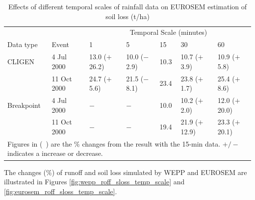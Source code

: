 \begin{table}[htbp]
  \centering
  \footnotesize
  \caption[Effects of different temporal scales of rainfall data on EUROSEM
estimation of soil loss]{Effects of different temporal scales of rainfall data
on EUROSEM estimation of soil loss (t/ha)}
  \label{tab:DifferentTemporalScalesOfRainfallDataOnEUROSEMSoilLoss}
    \begin{tabular}{lllllll}
    \toprule
    & & \multicolumn{5}{c}{Temporal Scale (minutes)}\\
      \cmidrule{3-7}
    Data type & Event & 1 & 5 & 15 & 30 & 60 \\
    \midrule
    CLIGEN & 4 Jul 2000 & 13.0 ($+$26.2) & 10.0 ($-$2.9) & 10.3 & 10.7 ($+$3.9)
& 10.9 ($+$5.8) \\
     & 11 Oct 2000 & 24.7 ($+$5.6) & 21.5 ($-$8.1) & 23.4 & 23.8 ($+$1.7) & 25.4
($+$8.6) \\
     \midrule
    Breakpoint & 4 Jul 2000 & $-$ & $-$ & 10.0 & 10.2 ($+$2.0) & 12.0 ($+$20.0)
\\
     & 11 Oct 2000 & $-$ & $-$ & 19.4 & 21.9 ($+$12.9) & 23.3 ($+$20.1) \\
    \bottomrule
    \multicolumn{7}{p{12cm}}{\footnotesize Figures in (\ ) are the \% changes
from the result with the 15-min data. $+/-$ indicates a increase or decrease.}\\
    \end{tabular}
\end{table}

The changes (\%) of runoff and soil loss simulated by WEPP and EUROSEM are
illustrated in Figures \ref{fig:wepp_roff_sloss_temp_scale} and
\ref{fig:eurosem_roff_sloss_temp_scale}.

